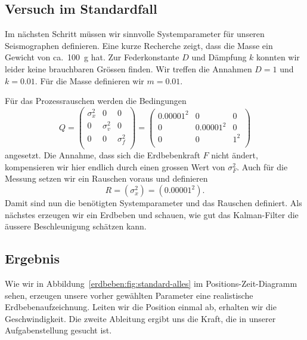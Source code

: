 \subsection{Versuch im Standardfall}
Im nächsten Schritt müssen wir sinnvolle Systemparameter für unseren Seismographen definieren.
Eine kurze Recherche zeigt, dass die Masse ein Gewicht von ca.\ \SI{100}{\gram} hat.
Zur Federkonstante $D$ und Dämpfung $k$ konnten wir leider keine brauchbaren Grössen finden.
Wir treffen die Annahmen $D = 1$ und $k = 0.01$.
Für die Masse definieren wir $m = 0.01$.

Für das Prozessrauschen werden die Bedingungen
\begin{equation}
  Q = 
  \begin{pmatrix}
    \sigma_x ^2 & 0          & 0 \\
    0           & \sigma_v^2 & 0\\
    0           & 0          & \sigma_f^2 \\
  \end{pmatrix}=
  \begin{pmatrix}
    0.00001^2& 0& 0 \\
    0 & 0.00001^2& 0\\
    0 & 0& 1^2 \\
  \end{pmatrix}
\end{equation}
angesetzt.
Die Annahme, dass sich die Erdbebenkraft $F$ nicht ändert,
kompensieren wir hier endlich durch einen grossen Wert von $\sigma_F^2$.
Auch für die Messung setzen wir ein Rauschen voraus und definieren
\begin{equation}
  R
  = 
  ( \sigma_x^2 )
  =
  (0.00001^2)
  .
\end{equation}
Damit sind nun die benötigten Systemparameter und das Rauschen definiert.
Als nächstes erzeugen wir ein Erdbeben und schauen,
wie gut das Kalman-Filter die äussere Beschleunigung schätzen kann.

\subsection*{Ergebnis}

Wie wir in Abbildung~\ref{erdbeben:fig:standard-alles} im Positions-Zeit-Diagramm sehen, erzeugen unsere vorher gewählten Parameter eine realistische Erdbebenaufzeichnung.
Leiten wir die Position einmal ab, erhalten wir die Geschwindigkeit.
Die zweite Ableitung ergibt uns die Kraft, die in unserer Aufgabenstellung gesucht ist.

